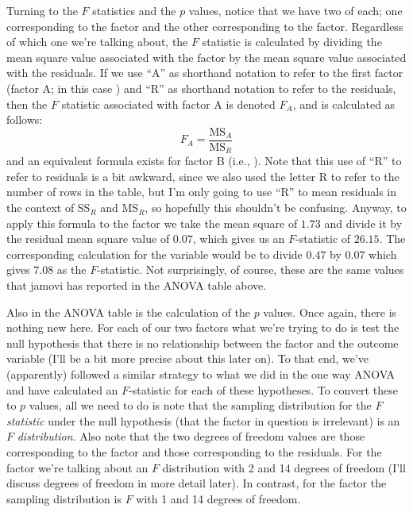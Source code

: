 Turning to the $F$ statistics and the $p$ values, notice that we have two of each; one corresponding to the  factor and the other corresponding to the  factor. Regardless of which one we're talking about, the $F$ statistic is calculated by dividing the mean square value associated with the factor by the mean square value associated with the residuals. If we use ``A'' as shorthand notation to refer to the first factor (factor A; in this case ) and ``R'' as shorthand notation to refer to the residuals, then the $F$ statistic associated with factor A is denoted $F_A$, and is calculated as follows:
$$
F_{A} = \frac{\mbox{MS}_{A}}{\mbox{MS}_{R}}
$$
and an equivalent formula exists for factor B (i.e., ). Note that this use of ``R'' to refer to residuals is a bit awkward, since we also used the letter R to refer to the number of rows in the table, but I'm only going to use ``R'' to mean residuals in the context of SS$_R$ and MS$_R$, so hopefully this shouldn't be confusing. Anyway, to apply this formula to the   factor we take the mean square of $1.73$ and divide it by the residual mean square value of $0.07$, which gives us an $F$-statistic of $26.15$. The corresponding calculation for the  variable would be to divide $0.47$ by $0.07$ which gives $7.08$ as the $F$-statistic. Not surprisingly, of course, these are the same values that jamovi has reported in the ANOVA table above.

Also in the ANOVA table is the calculation of the $p$ values. Once again, there is nothing new here. For each of our two factors what we're trying to do is test the null hypothesis that there is no relationship between the factor and the outcome variable (I'll be a bit more precise about this later on). To that end, we've (apparently) followed a similar strategy to what we did in the one way ANOVA and have calculated an $F$-statistic for each of these hypotheses. To convert these to $p$ values, all we need to do is note that the sampling distribution for the $F$ {\it statistic} under the null hypothesis (that the factor in question is irrelevant) is an $F$ {\it distribution}. Also note that the two degrees of freedom values are those corresponding to the factor and those corresponding to the residuals. For the  factor we're talking about an $F$ distribution with 2 and 14 degrees of freedom (I'll discuss degrees of freedom in more detail later). In contrast, for the  factor the sampling distribution is $F$ with 1 and 14 degrees of freedom. 

